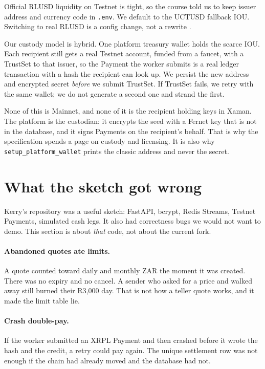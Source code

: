 \documentclass[11pt]{article}
\begin{document}
Official RLUSD liquidity on Testnet is tight, so the course told us to keep issuer address and currency code in \texttt{.env}. We default to the UCTUSD fallback IOU. Switching to real RLUSD is a config change, not a rewrite \citep{UCTResources2026}.

Our custody model is hybrid. One platform treasury wallet holds the scarce IOU. Each recipient still gets a real Testnet account, funded from a faucet, with a TrustSet to that issuer, so the Payment the worker submits is a real ledger transaction with a hash the recipient can look up. We persist the new address and encrypted secret \emph{before} we submit TrustSet. If TrustSet fails, we retry with the same wallet; we do not generate a second one and strand the first.

None of this is Mainnet, and none of it is the recipient holding keys in Xaman. The platform is the custodian: it encrypts the seed with a Fernet key that is not in the database, and it signs Payments on the recipient's behalf. That is why the specification spends a page on custody and licensing. It is also why \texttt{setup\_platform\_wallet} prints the classic address and never the secret.

\section{What the sketch got wrong}
Kerry's repository was a useful sketch: FastAPI, bcrypt, Redis Streams, Testnet Payments, simulated cash legs. It also had correctness bugs we would not want to demo. This section is about \emph{that} code, not about the current fork.

\paragraph{Abandoned quotes ate limits.}
A quote counted toward daily and monthly ZAR the moment it was created. There was no expiry and no cancel. A sender who asked for a price and walked away still burned their R3{,}000 day. That is not how a teller quote works, and it made the limit table lie.

\paragraph{Crash double-pay.}
If the worker submitted an XRPL Payment and then crashed before it wrote the hash and the credit, a retry could pay again. The unique settlement row was not enough if the chain had already moved and the database had not.
\end{document}
